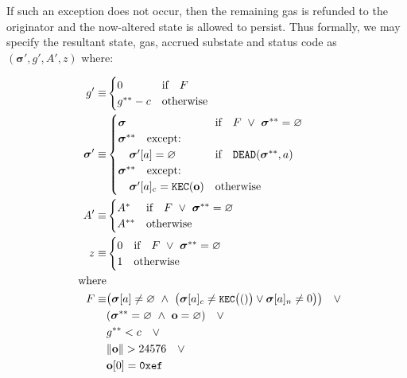 \documentclass[9pt,oneside]{amsart}
\begin{document}
\begin{multicols}{2}
If such an exception does not occur, then the remaining gas is refunded to the originator and the now-altered state is allowed to persist. Thus formally, we may specify the resultant state, gas, accrued substate and status code as $(\boldsymbol{\sigma}', g', A', z)$ where:

\begin{align}
\quad g' \equiv & \begin{cases}
0 & \text{if} \quad F \\
g^{**} - c & \text{otherwise} \\
\end{cases} \\
\quad \boldsymbol{\sigma}' \equiv & \begin{cases}
\boldsymbol{\sigma} & \text{if} \quad F \ \lor\ \boldsymbol{\sigma}^{**} = \varnothing \\
\boldsymbol{\sigma}^{**} \quad \text{except:} & \\
\quad\boldsymbol{\sigma}'[a] = \varnothing & \text{if} \quad \mathtt{DEAD}(\boldsymbol{\sigma}^{**}, a) \\
\boldsymbol{\sigma}^{**} \quad \text{except:} & \\
\quad\boldsymbol{\sigma}'[a]_{\mathrm{c}} = \texttt{KEC}(\mathbf{o}) & \text{otherwise}
\end{cases} \\
\quad A' \equiv & \begin{cases}
A^* & \text{if} \quad F \ \lor\ \boldsymbol{\sigma}^{**} = \varnothing \\
A^{**} & \text{otherwise} \\
\end{cases} \\
\quad z \equiv & \begin{cases}
0 & \text{if} \quad F \ \lor\ \boldsymbol{\sigma}^{**} = \varnothing \\
1 & \text{otherwise}
\end{cases} \\
\nonumber \text{where} \\
F \equiv  & \big( \boldsymbol{\sigma}[a] \neq \varnothing \ \wedge\ \big(\boldsymbol{\sigma}[a]_c \neq \texttt{\small KEC}\big(()\big) \vee \boldsymbol{\sigma}[a]_n \neq 0 \big) \big) \quad \vee \\
\nonumber &(\boldsymbol{\sigma}^{**} = \varnothing \ \wedge\ \mathbf{o} = \varnothing) \quad \vee \\
\nonumber &g^{**} < c \quad \vee \\
\nonumber &\lVert \mathbf{o} \rVert > 24576 \quad \vee \\
\nonumber &\mathbf{o}[0] = \texttt{0xef}
\end{align}
\hypertarget{contract_creation_result}{}


\end{multicols}
\end{document}
